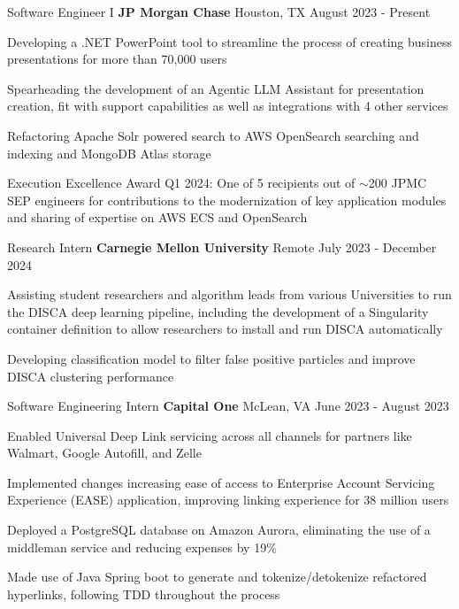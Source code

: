 
\begin{cventries}
  \cventry
    {Software Engineer I}
    {\textbf{JP Morgan Chase}}
    {Houston, TX}
    {August 2023 - Present}
    {
      \begin{cvitems}
        \item{Developing a .NET PowerPoint tool to streamline the process of creating business presentations for more than 70,000 users}
        \item{Spearheading the development of an Agentic LLM Assistant for presentation creation, fit with support capabilities as well as integrations with 4 other services}
        \item{Refactoring Apache Solr powered search to AWS OpenSearch searching and indexing and MongoDB Atlas storage}
        \item{Execution Excellence Award Q1 2024: One of 5 recipients out of $\sim$200 JPMC SEP engineers for contributions to the modernization of key application modules and sharing of expertise on AWS ECS and OpenSearch}
      \end{cvitems}
    }

  \cventry
    {Research Intern}
    {\textbf{Carnegie Mellon University}}
    {Remote}
    {July 2023 - December 2024}
    {
      \begin{cvitems}
        \item{Assisting student researchers and algorithm leads from various Universities to run the DISCA deep learning pipeline, including the development of a Singularity container definition to allow researchers to install and run DISCA automatically}
        \item{Developing classification model to filter false positive particles and improve DISCA clustering performance}
      \end{cvitems}
    }

  \cventry
    {Software Engineering Intern}
    {\textbf{Capital One}}
    {McLean, VA}
    {June 2023 - August 2023}
    {
      \begin{cvitems}
        \item{Enabled Universal Deep Link servicing across all channels for partners like Walmart, Google Autofill, and Zelle}
        \item{Implemented changes increasing ease of access to Enterprise Account Servicing Experience (EASE) application, improving linking experience for 38 million users}
        \item{Deployed a PostgreSQL database on Amazon Aurora, eliminating the use of a middleman service and reducing expenses by 19\%}
        \item{Made use of Java Spring boot to generate and tokenize/detokenize refactored hyperlinks, following TDD throughout the process}
      \end{cvitems}
    }


\end{cventries}
